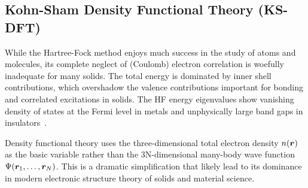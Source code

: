 \subsection{Kohn-Sham Density Functional Theory (KS-DFT)}
While the Hartree-Fock method enjoys much success in the study of atoms and molecules, its complete neglect of (Coulomb) electron correlation is woefully inadequate for many solids. The total energy is dominated by inner shell contributions, which overshadow the valence contributions important for bonding and correlated excitations in solids. The HF energy eigenvalues show vanishing density of states at the Fermi level in metals and unphysically large band gaps in insulators~\cite{Perdew1981}.

Density functional theory uses the three-dimensional total electron density $n(\boldsymbol{r})$ as the basic variable rather than the 3N-dimensional many-body wave function $\Psi(\boldsymbol{r}_1,\dots,\boldsymbol{r}_N)$. This is a dramatic simplification that likely lead to its dominance in modern electronic structure theory of solids and material science.


